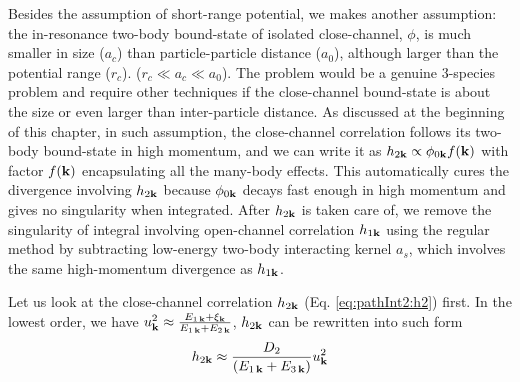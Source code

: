 Besides the assumption of short-range potential, we makes another assumption:  the in-resonance two-body bound-state of isolated close-channel, $\phi$, is much smaller in size ($a_{c}$) than particle-particle distance ($a_{0}$), although larger than the potential range ($r_{c}$).     ($r_{c}\ll{}a_{c}\ll{}a_{0}$).  The problem would be a genuine 3-species problem and require other techniques if the close-channel bound-state is about the size  or even larger than  inter-particle distance. As discussed at the beginning of this chapter, in such assumption, the close-channel correlation follows its two-body bound-state in high momentum, and  we can write it as $h_{2\mathbf{k}}\propto\phi_{0\mathbf{k}}f(\mathbf{k})$ with factor $f(\mathbf{k})$ encapsulating all the many-body effects. This automatically cures the divergence involving $h_{2\mathbf{k}}$ because $\phi_{0\mathbf{k}}$ decays fast enough in high momentum and gives no singularity when integrated.   After $h_{2\mathbf{k}}$ is taken care of, we remove the singularity of integral involving open-channel correlation $h_{1\mathbf{k}}$ using the regular method by subtracting low-energy two-body interacting kernel $a_{s}$, which involves  the same high-momentum divergence as $h_{1\mathbf{k}}$. 



 Let us look at the close-channel correlation $h_{2\mathbf{k}}$ (Eq. \ref{eq:pathInt2:h2}) first. In the lowest order, we have $u_{\mathbf{k}}^{2}\approx\frac{E_{1\,\mathbf{k}}+\xi_{\mathbf{k}}}{E_{1\,\mathbf{k}}+E_{2\,\mathbf{k}}}$, $h_{2\mathbf{k}}$ can be rewritten into such form
\begin{equation}\label{eq:pathInt2:h2D2}
 h_{2\mathbf{k}}\approx\frac{D_{2}}{(E_{1\,\mathbf{k}}+E_{3\,\mathbf{k}})}u_{\mathbf{k}}^{2}
\end{equation}

 
